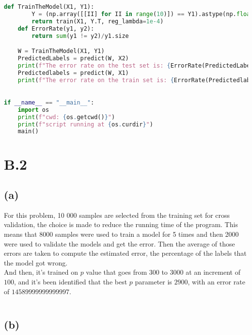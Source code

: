 \documentclass[]{article}
\begin{document}
\begin{lstlisting}[language=python]
    def TrainTheModel(X1, Y1):
        Y = (np.array([[II] for II in range(10)]) == Y1).astype(np.float)
        return train(X1, Y.T, reg_lambda=1e-4)
    def ErrorRate(y1, y2):
        return sum(y1 != y2)/y1.size

    W = TrainTheModel(X1, Y1)
    PredictedLabels = predict(W, X2)
    print(f"The error rate on the test set is: {ErrorRate(PredictedLabels, Y2)}")
    Predictedlabels = predict(W, X1)
    print(f"The error rate on the train set is: {ErrorRate(Predictedlabels, Y1)}")
 

if __name__ == "__main__":
    import os
    print(f"cwd: {os.getcwd()}")
    print(f"script running at {os.curdir}")
    main()
        \end{lstlisting}

    \section*{B.2}
        \subsection*{(a)}
        For this problem, 10 000 samples are selected from the training set for cross validation, the choice is made to reduce the running time of the program. This means that 8000 samples were used to train a model for 5 times and then 2000 were used to validate the models and get the error. Then the average of those errors are taken to compute the estimated error, the percentage of the labels that the model got wrong. 
        \\
        And then, it's trained on $p$ value that goes from $300$ to $3000$ at an increment of $100$, and it's been identified that the best $p$ parameter is $2900$, with an error rate of $14589999999999997$. 
        \begin{lstlisting}[language=python]
        \end{lstlisting}
        \subsection*{(b)}

        
\end{document}
